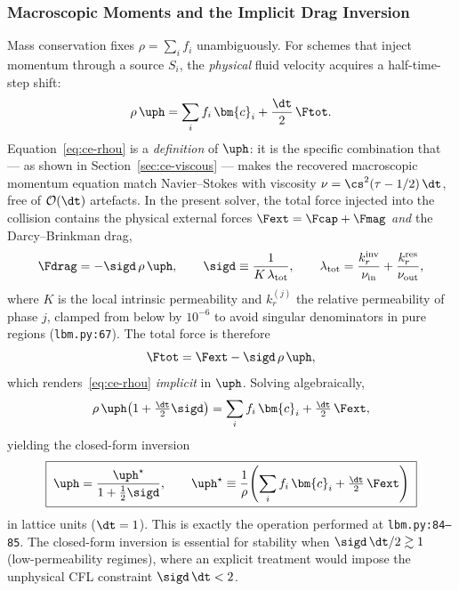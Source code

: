 \subsubsection{Macroscopic Moments and the Implicit Drag Inversion}\label{sec:ce-moments}

Mass conservation fixes $\rho = \sum_i f_i$ unambiguously.
For schemes that inject momentum through a source $S_i$, the \emph{physical} fluid velocity acquires a half-time-step shift:
\begin{equation}
\rho\,\uph = \sum_i f_i\,\bm{c}_i + \frac{\dt}{2}\,\Ftot.
\label{eq:ce-rhou}
\end{equation}
Equation~\eqref{eq:ce-rhou} is a \emph{definition} of $\uph$: it is the specific combination that --- as shown in Section~\ref{sec:ce-viscous} --- makes the recovered macroscopic momentum equation match Navier--Stokes with viscosity $\nu = \cs^{2}(\tau-1/2)\,\dt$, free of $\mathcal{O}(\dt)$ artefacts.
In the present solver, the total force injected into the collision contains the physical external forces $\Fext = \Fcap + \Fmag$ \emph{and} the Darcy--Brinkman drag,
\begin{equation}
\Fdrag = -\sigd\,\rho\,\uph,\qquad \sigd \equiv \frac{1}{K\,\lambda_{\mathrm{tot}}},\qquad \lambda_{\mathrm{tot}} = \frac{k_r^{\mathrm{inv}}}{\nu_{\mathrm{in}}} + \frac{k_r^{\mathrm{res}}}{\nu_{\mathrm{out}}},
\label{eq:ce-darcy}
\end{equation}
where $K$ is the local intrinsic permeability and $k_r^{(j)}$ the relative permeability of phase $j$, clamped from below by $10^{-6}$ to avoid singular denominators in pure regions (\texttt{lbm.py:67}).
The total force is therefore
\begin{equation}
\Ftot = \Fext - \sigd\,\rho\,\uph,
\label{eq:ce-Ftot}
\end{equation}
which renders~\eqref{eq:ce-rhou} \emph{implicit} in $\uph$.
Solving algebraically,
\begin{equation}
\rho\,\uph\!\left(1 + \tfrac{\dt}{2}\sigd\right) = \sum_i f_i\,\bm{c}_i + \tfrac{\dt}{2}\,\Fext,
\end{equation}
yielding the closed-form inversion
\begin{equation}
\boxed{\;\uph = \frac{\uph^{\star}}{1 + \tfrac{1}{2}\sigd},\qquad \uph^{\star} \equiv \frac{1}{\rho}\!\left(\sum_i f_i\,\bm{c}_i + \tfrac{\dt}{2}\,\Fext\right)\;}
\label{eq:ce-uphys}
\end{equation}
in lattice units ($\dt = 1$).
This is exactly the operation performed at \texttt{lbm.py:84--85}. The closed-form inversion is essential for stability when $\sigd\,\dt/2 \gtrsim 1$ (low-permeability regimes), where an explicit treatment would impose the unphysical CFL constraint $\sigd\,\dt < 2$.

